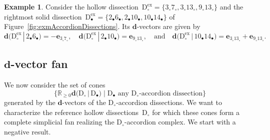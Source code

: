 \documentclass{amsart}
\theoremstyle{definition}
\newtheorem{example}[theorem]{Example}
\newcommand{\R}{\mathbb{R}} %
\renewcommand{\b}[1]{\mathbf{#1}} %
\newcommand{\bigset}[2]{\big\{ #1 \;\big|\; #2 \big\}} %
\newcommand{\fref}[1]{Figure~\ref{#1}} %
\newcommand{\dissection}{\mathrm{D}} %
\newcommand{\bigdvector}[2]{\mathbf{d} \big( #1  \,|\, #2 \big)} %
\newcommand{\bigdvectors}[2]{\mathbf{d} \big( #1  \,|\, #2 \big)} %
\newcommand{\ex}{\mathrm{ex}} %
\begin{document}
\begin{example}
Consider the hollow dissection~$\dissection_\circ^\ex = \{3_\circ 7_\circ, 3_\circ 13_\circ, 9_\circ 13_\circ\}$ and the rightmost solid dissection~$\dissection_\bullet^\ex = \{2_\bullet 6_\bullet, 2_\bullet 10_\bullet, 10_\bullet 14_\bullet\}$ of \fref{fig:exmAccordionDissections}. Its $\b{d}$-vectors are given by
\[
\bigdvector{\dissection_\circ^\ex}{2_\bullet 6_\bullet} = - \b{e}_{3_\circ 7_\circ},
\quad
\bigdvector{\dissection_\circ^\ex}{2_\bullet 10_\bullet} = \b{e}_{9_\circ 13_\circ},
\quad\text{and}\quad
\bigdvector{\dissection_\circ^\ex}{10_\bullet 14_\bullet} = \b{e}_{3_\circ 13_\circ} + \b{e}_{9_\circ 13_\circ}.
\]
\end{example}

\subsection{$\b{d}$-vector fan}

We now consider the set of cones
\[
\bigset{\R_{\ge0} \bigdvectors{\dissection_\circ}{\dissection_\bullet}}{\dissection_\bullet \text{ any $\dissection_\circ$-accordion dissection}}
\]
generated by the $\b{d}$-vectors of the $\dissection_\circ$-accordion dissections. We want to characterize the reference hollow dissections~$\dissection_\circ$ for which these cones form a complete simplicial fan realizing the $\dissection_\circ$-accordion complex. We start with a negative result.
\end{document}
